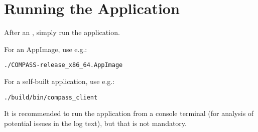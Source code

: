 \section{Running the Application}

After an , simply run the application.

For an AppImage, use e.g.:
\begin{lstlisting}
./COMPASS-release_x86_64.AppImage
\end{lstlisting}

For a self-built application, use e.g.:
\begin{lstlisting}
./build/bin/compass_client
\end{lstlisting}

It is recommended to run the application from a console terminal (for analysis of potential issues in the log text), but that is not mandatory.
